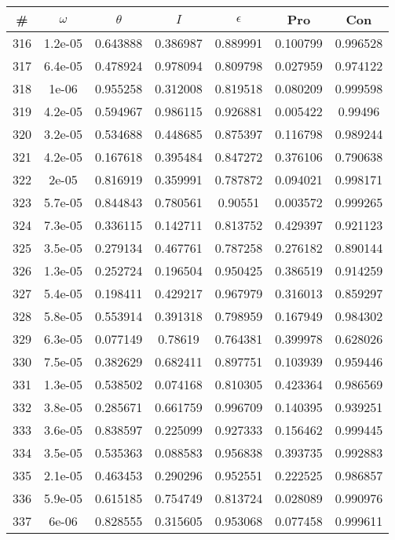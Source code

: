 \newpage
\begin{table}
\begin{tabular}{c|c|c|c|c|c|c}
\# & $\omega$ & $\theta$ & $I$ & $\epsilon$ & Pro & Con\\
\hline
316 & 1.2e-05 & 0.643888 & 0.386987 & 0.889991 & 0.100799 & 0.996528\\
317 & 6.4e-05 & 0.478924 & 0.978094 & 0.809798 & 0.027959 & 0.974122\\
318 & 1e-06 & 0.955258 & 0.312008 & 0.819518 & 0.080209 & 0.999598\\
319 & 4.2e-05 & 0.594967 & 0.986115 & 0.926881 & 0.005422 & 0.99496\\
320 & 3.2e-05 & 0.534688 & 0.448685 & 0.875397 & 0.116798 & 0.989244\\
321 & 4.2e-05 & 0.167618 & 0.395484 & 0.847272 & 0.376106 & 0.790638\\
322 & 2e-05 & 0.816919 & 0.359991 & 0.787872 & 0.094021 & 0.998171\\
323 & 5.7e-05 & 0.844843 & 0.780561 & 0.90551 & 0.003572 & 0.999265\\
324 & 7.3e-05 & 0.336115 & 0.142711 & 0.813752 & 0.429397 & 0.921123\\
325 & 3.5e-05 & 0.279134 & 0.467761 & 0.787258 & 0.276182 & 0.890144\\
326 & 1.3e-05 & 0.252724 & 0.196504 & 0.950425 & 0.386519 & 0.914259\\
327 & 5.4e-05 & 0.198411 & 0.429217 & 0.967979 & 0.316013 & 0.859297\\
328 & 5.8e-05 & 0.553914 & 0.391318 & 0.798959 & 0.167949 & 0.984302\\
329 & 6.3e-05 & 0.077149 & 0.78619 & 0.764381 & 0.399978 & 0.628026\\
330 & 7.5e-05 & 0.382629 & 0.682411 & 0.897751 & 0.103939 & 0.959446\\
331 & 1.3e-05 & 0.538502 & 0.074168 & 0.810305 & 0.423364 & 0.986569\\
332 & 3.8e-05 & 0.285671 & 0.661759 & 0.996709 & 0.140395 & 0.939251\\
333 & 3.6e-05 & 0.838597 & 0.225099 & 0.927333 & 0.156462 & 0.999445\\
334 & 3.5e-05 & 0.535363 & 0.088583 & 0.956838 & 0.393735 & 0.992883\\
335 & 2.1e-05 & 0.463453 & 0.290296 & 0.952551 & 0.222525 & 0.986857\\
336 & 5.9e-05 & 0.615185 & 0.754749 & 0.813724 & 0.028089 & 0.990976\\
337 & 6e-06 & 0.828555 & 0.315605 & 0.953068 & 0.077458 & 0.999611\\

\end{tabular}
\end{table}
